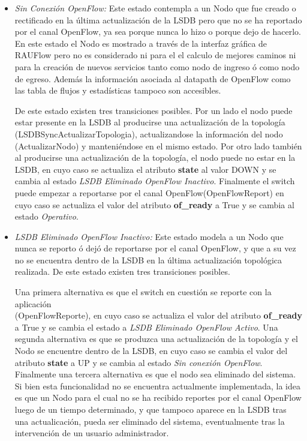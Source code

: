 \begin{itemize}
\item \textit{Sin Conexión OpenFlow:} Este estado contempla a un Nodo que fue creado o rectificado en la \'ultima actualización de la LSDB pero que no se ha reportado por el canal OpenFlow, ya sea porque nunca lo hizo o porque dejo de hacerlo. En este estado el Nodo es mostrado a trav\'es de la interfaz gr\'afica de RAUFlow pero no es considerado ni para el el calculo de mejores caminos ni para la creaci\'on de nuevos servicios tanto como nodo de ingreso \'o como nodo de egreso. Adem\'as la informaci\'on asociada al datapath de OpenFlow como las tabla de flujos y estad\'isticas tampoco son accesibles.

De este estado existen tres transiciones posibles. Por un lado el nodo puede estar presente en la LSDB al producirse una actualizaci\'on de la topolog\'ia\\ (LSDBSyncActualizarTopologia), actualizandose la informaci\'on del nodo \\ (ActualizarNodo) y manteniéndose en el mismo estado. Por otro lado tambi\'en al producirse una actualizaci\'on de la topolog\'ia, el nodo puede no estar en la LSDB, en cuyo caso se actualiza el atributo \textbf{state} al valor DOWN y se cambia al estado \textit{LSDB Eliminado OpenFlow Inactivo}. Finalmente el switch puede empezar a reportarse por el canal OpenFlow(OpenFlowReport) en cuyo caso se actualiza el valor del atributo \textbf{of\_ready} a True y se cambia al estado \textit{Operativo}.  

\item \textit{LSDB Eliminado OpenFlow Inactivo:} Este estado modela a un Nodo que nunca se reporto \'o dej\'o de reportarse por el canal OpenFlow, y que a su vez no se encuentra dentro de la LSDB en la \'ultima actualizaci\'on topol\'ogica realizada. De este estado existen tres transiciones posibles.

Una primera alternativa es que el switch en cuesti\'on se reporte con la aplicaci\'on \\ (OpenFlowReporte), en cuyo caso se actualiza el valor del atributo \textbf{of\_ready} a True y se cambia el estado a \textit{LSDB Eliminado OpenFlow Activo}. Una segunda alternativa es que se produzca una actualizaci\'on de la topolog\'ia y el Nodo se encuentre dentro de la LSDB, en cuyo caso se cambia el valor del atributo \textbf{state} a UP y se cambia al estado \textit{Sin conexión OpenFlow}. Finalmente una tercera alternativa es que el nodo  sea eliminado del sistema. Si bien esta funcionalidad no se encuentra actualmente implementada, la idea es que un Nodo para el cual no se ha recibido reportes por el canal OpenFlow luego de un tiempo determinado, y que tampoco aparece en la LSDB tras una actualicaci\'on, pueda ser eliminado del sistema, eventualmente tras la intervenci\'on de un usuario administrador.
  
\end{itemize}

